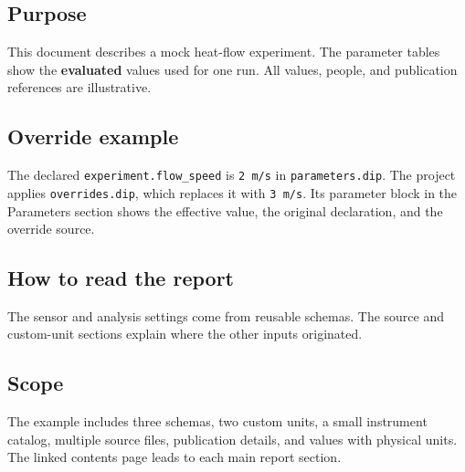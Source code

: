 \subsection{Purpose}
This document describes a mock heat-flow experiment. The parameter tables show
the \textbf{evaluated} values used for one run. All values, people, and
publication references are illustrative.

\subsection{Override example}
The declared \texttt{experiment.flow\_speed} is \texttt{2 m/s} in
\texttt{parameters.dip}. The project applies \texttt{overrides.dip}, which
replaces it with \texttt{3 m/s}. Its parameter block in the Parameters section
shows the effective value, the original declaration, and the override source.

\subsection{How to read the report}
The sensor and analysis settings come from reusable schemas. The source and
custom-unit sections explain where the other inputs originated.

\subsection{Scope}
The example includes three schemas, two custom units, a small instrument catalog,
multiple source files,
publication details, and values with physical units. The linked contents page
leads to each main report section.
